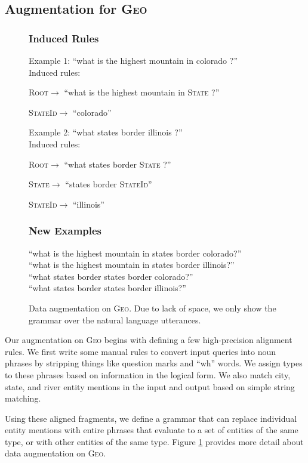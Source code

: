 \documentclass[11pt,letterpaper]{article}
\newcommand{\geo}{\textsc{Geo}\xspace}
\newcommand{\catroot}{\textsc{Root}\xspace}
\newcommand{\catstate}{\textsc{State}\xspace}
\newcommand{\catstateid}{\textsc{StateId}\xspace}
\begin{document}
\subsection{Augmentation for \geo}
\begin{figure}[t] 
\small
\begin{framed}
\footnotesize
\subsubsection*{Induced Rules}
Example 1: ``what is the highest mountain in colorado ?''\\
Induced rules:

\quad \catroot $\to$ ``what is the highest mountain in \catstate { }?''

\quad \catstateid $\to$ ``colorado''

Example 2: ``what states border illinois ?''\\
Induced rules:

\quad \catroot $\to$ ``what states border \catstate { }?''

\quad \catstate $\to$ ``states border \catstateid''

\quad \catstateid $\to$ ``illinois''

\subsubsection*{New Examples} 
``what is the highest mountain in states border colorado?'' \\
``what is the highest mountain in states border illinois?'' \\
``what states border states border colorado?'' \\
``what states border states border illinois?''
\end{framed}
\caption{Data augmentation on \geo.  Due to lack of space,
we only show the grammar over the natural language utterances.}
\label{fig:augment-geo}
\end{figure}
Our augmentation on \geo begins with defining a few high-precision alignment rules.
We first write some manual rules to convert input queries into noun phrases
by stripping things like question marks and ``wh'' words.
We assign types to these phrases based on information in the logical form.
We also match city, state, and river entity mentions in the input and output
based on simple string matching.

Using these aligned fragments,
we define a grammar that can replace individual entity mentions
with entire phrases that evaluate to a set of entities of the same type,
or with other entities of the same type.
Figure \ref{fig:augment-geo}
provides more detail about data augmentation on \geo.
\end{document}
